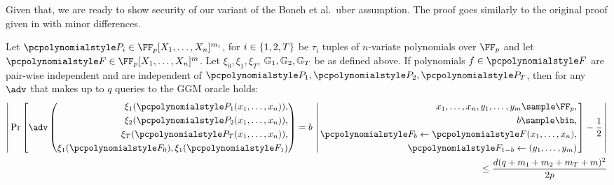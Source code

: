 \documentclass[runningheads,11pt]{llncs}
\begin{document}
Given that, we are ready to show security of our variant of the Boneh et
al.~uber assumption. The proof goes similarly to the original proof given in
\cite{EC:BonBoyGoh05} with minor differences.

\begin{theorem}
  \label{thm:uber_assumption}
  Let $\p{P}_i \in \FF_p[X_1, \ldots, X_n]^{m_i}$, for
  $i \in \{1, 2, T\}$ be $\tau_i$ tuples of $n$-variate polynomials over
  $\FF_p$ and let $\p{F} \in \FF_p[X_1, \ldots, X_n]^m$. Let
  $\xi_0, \xi_1, \xi_T$, $\mathbb{G}_1, \mathbb{G}_2, \mathbb{G}_T$ be as defined above. If
  polynomials $f \in \p{F}$ are pair-wise independent and are independent of
  $\p{P}_1, \p{P}_2, \p{P}_T$, then for any $\adv$ that makes up to $q$ queries to the
  GGM oracle holds:
  \begin{equation*}
    \begin{split}
     \left|\,
    \Pr\left[
    \adv\left(
      \begin{aligned}
        \xi_1(\p{P}_1(x_1, \ldots, x_n)), \\
        \xi_2(\p{P}_2(x_1, \ldots, x_n)), \\
        \xi_T(\p{P}_T(x_1, \ldots, x_n)), \\
        \xi_{1}(\p{F}_0), \xi_{1}(\p{F}_1)
      \end{aligned}
    \right) = b
    \, \left|\,
      \begin{aligned}
        x_1, \ldots, x_n, y_1, \ldots, y_m \sample \FF_p,\\
        b \sample \bin, \\
        \p{F}_b \gets \p{F}(x_1, \ldots, x_n),\\
        \p{F}_{1 - b} \gets (y_1, \ldots, y_m)
      \end{aligned}
    \right.  \right] - \frac{1}{2} \, \right| \\
     \leq \frac{d(q + m_1 + m_2 + m_T +
      m)^2 }{2p}
    \end{split}
  \end{equation*}
\end{theorem}
\end{document}

